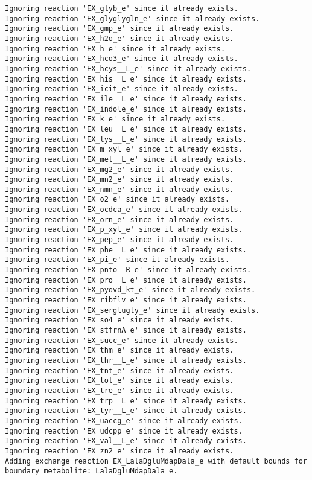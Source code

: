 \documentclass[
  letterpaper,
  DIV=11,
  numbers=noendperiod]{scrartcl}
\begin{document}
\begin{verbatim}
Ignoring reaction 'EX_glyb_e' since it already exists.
Ignoring reaction 'EX_glyglygln_e' since it already exists.
Ignoring reaction 'EX_gmp_e' since it already exists.
Ignoring reaction 'EX_h2o_e' since it already exists.
Ignoring reaction 'EX_h_e' since it already exists.
Ignoring reaction 'EX_hco3_e' since it already exists.
Ignoring reaction 'EX_hcys__L_e' since it already exists.
Ignoring reaction 'EX_his__L_e' since it already exists.
Ignoring reaction 'EX_icit_e' since it already exists.
Ignoring reaction 'EX_ile__L_e' since it already exists.
Ignoring reaction 'EX_indole_e' since it already exists.
Ignoring reaction 'EX_k_e' since it already exists.
Ignoring reaction 'EX_leu__L_e' since it already exists.
Ignoring reaction 'EX_lys__L_e' since it already exists.
Ignoring reaction 'EX_m_xyl_e' since it already exists.
Ignoring reaction 'EX_met__L_e' since it already exists.
Ignoring reaction 'EX_mg2_e' since it already exists.
Ignoring reaction 'EX_mn2_e' since it already exists.
Ignoring reaction 'EX_nmn_e' since it already exists.
Ignoring reaction 'EX_o2_e' since it already exists.
Ignoring reaction 'EX_ocdca_e' since it already exists.
Ignoring reaction 'EX_orn_e' since it already exists.
Ignoring reaction 'EX_p_xyl_e' since it already exists.
Ignoring reaction 'EX_pep_e' since it already exists.
Ignoring reaction 'EX_phe__L_e' since it already exists.
Ignoring reaction 'EX_pi_e' since it already exists.
Ignoring reaction 'EX_pnto__R_e' since it already exists.
Ignoring reaction 'EX_pro__L_e' since it already exists.
Ignoring reaction 'EX_pyovd_kt_e' since it already exists.
Ignoring reaction 'EX_ribflv_e' since it already exists.
Ignoring reaction 'EX_serglugly_e' since it already exists.
Ignoring reaction 'EX_so4_e' since it already exists.
Ignoring reaction 'EX_stfrnA_e' since it already exists.
Ignoring reaction 'EX_succ_e' since it already exists.
Ignoring reaction 'EX_thm_e' since it already exists.
Ignoring reaction 'EX_thr__L_e' since it already exists.
Ignoring reaction 'EX_tnt_e' since it already exists.
Ignoring reaction 'EX_tol_e' since it already exists.
Ignoring reaction 'EX_tre_e' since it already exists.
Ignoring reaction 'EX_trp__L_e' since it already exists.
Ignoring reaction 'EX_tyr__L_e' since it already exists.
Ignoring reaction 'EX_uaccg_e' since it already exists.
Ignoring reaction 'EX_udcpp_e' since it already exists.
Ignoring reaction 'EX_val__L_e' since it already exists.
Ignoring reaction 'EX_zn2_e' since it already exists.
Adding exchange reaction EX_LalaDgluMdapDala_e with default bounds for boundary metabolite: LalaDgluMdapDala_e.

\end{verbatim}
\end{document}
